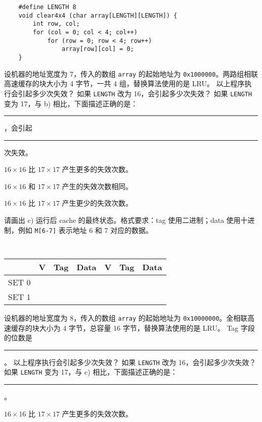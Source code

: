 \begin{problems}
\begin{verbatim}
    #define LENGTH 8
    void clear4x4 (char array[LENGTH][LENGTH]) {
        int row, col;
        for (col = 0; col < 4; col++)
            for (row = 0; row < 4; row++)
                array[row][col] = 0;
    }
        \end{verbatim}
        \qn 设机器的地址宽度为 7，传入的数组 \verb|array| 的起始地址为 \verb|0x1000000|。两路组相联高速缓存的块大小为 4 字节，一共 4 组，替换算法使用的是 LRU。
            \subqn 以上程序执行会引起多少次失效？
            \subqn 如果 \verb|LENGTH| 改为 16，会引起多少次失效？
            \subqn 如果 \verb|LENGTH| 变为 17，与 b) 相比，下面描述正确的是：\rule{1cm}{0.25mm}，会引起 \rule{2.5cm}{0.25mm} 次失效。
            \begin{choices}
                \item $16 \times 16$ 比 $17 \times 17$ 产生更多的失效次数。
                \item $16 \times 16$ 和 $17 \times 17$ 产生的失效次数相同。
                \item $16 \times 16$ 比 $17 \times 17$ 产生更少的失效次数。
            \end{choices}
            \subqn 请画出 c) 运行后 cache 的最终状态。格式要求：tag 使用二进制；data 使用十进制，例如 \verb|M[6-7]| 表示地址 6 和 7 对应的数据。
            \begin{table}[H]
                \tt
                \centering
                \begin{tabular}{|c|c|c|c|c|c|c|}
                    \hline
                    & {\quad V \quad} & {\quad Tag \quad} & {\quad Data \quad} & {\quad V \quad} & {\quad Tag \quad} & {\quad Data \quad} \\ \hline
                    SET 0 &  &  &  &  &  &  \\ \hline
                    SET 1 &  &  &  &  &  &  \\ \hline
                \end{tabular}
            \end{table}
        \qn 设机器的地址宽度为 8，传入的数组 \verb|array| 的起始地址为 \verb|0x10000000|。全相联高速缓存的块大小为 4 字节，总容量 16 字节，替换算法使用的是 LRU。
            \subqn Tag 字段的位数是 \rule{2.5cm}{0.25mm}。
            \subqn 以上程序执行会引起多少次失效？
            \subqn 如果 \verb|LENGTH| 改为 16，会引起多少次失效？
            \subqn 如果 \verb|LENGTH| 变为 17，与 c) 相比，下面描述正确的是：\rule{1cm}{0.25mm}。
            \begin{choices}
                \item $16 \times 16$ 比 $17 \times 17$ 产生更多的失效次数。

\end{choices}
\end{problems}
